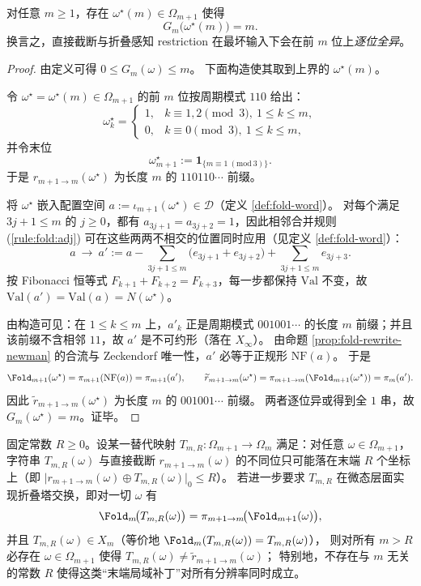 \begin{theorem}\label{thm:fold-gauge-anomaly-max}
对任意 \(m\ge 1\)，存在 \(\omega^\star(m)\in\Omega_{m+1}\) 使得
$$
G_m\bigl(\omega^\star(m)\bigr)=m.
$$
换言之，直接截断与折叠感知 restriction 在最坏输入下会在前 \(m\) 位上\emph{逐位全异}。
\end{theorem}

\begin{proof}
由定义可得 \(0\le G_m(\omega)\le m\)。
下面构造使其取到上界的 \(\omega^\star(m)\)。
\par
令 \(\omega^\star=\omega^\star(m)\in\Omega_{m+1}\) 的前 \(m\) 位按周期模式 \(110\) 给出：
$$
\omega^\star_k=
\begin{cases}
1,& k\equiv 1,2\pmod 3,\ 1\le k\le m,\\
0,& k\equiv 0\pmod 3,\ 1\le k\le m,
\end{cases}
$$
并令末位
$$
\omega^\star_{m+1}:=\mathbf{1}_{\{m\equiv 1\ (\mathrm{mod}\ 3)\}}.
$$
于是 \(r_{m+1\to m}(\omega^\star)\) 为长度 \(m\) 的 \(110110\cdots\) 前缀。
\par
将 \(\omega^\star\) 嵌入配置空间 \(a:=\iota_{m+1}(\omega^\star)\in\mathcal D\)（定义 \ref{def:fold-word}）。
对每个满足 \(3j+1\le m\) 的 \(j\ge 0\)，都有 \(a_{3j+1}=a_{3j+2}=1\)，因此相邻合并规则 (\ref{rule:fold:adj}) 可在这些两两不相交的位置同时应用（见定义 \ref{def:fold-word}）：
$$
a\ \to\ a':=a-\sum_{3j+1\le m}\bigl(e_{3j+1}+e_{3j+2}\bigr)+\sum_{3j+1\le m}e_{3j+3}.
$$
按 Fibonacci 恒等式 \(F_{k+1}+F_{k+2}=F_{k+3}\)，每一步都保持 \(\mathrm{Val}\) 不变，故 \(\mathrm{Val}(a')=\mathrm{Val}(a)=N(\omega^\star)\)。
\par
由构造可见：在 \(1\le k\le m\) 上，\(a'_k\) 正是周期模式 \(001001\cdots\) 的长度 \(m\) 前缀；并且该前缀不含相邻 \(11\)，故 \(a'\) 是不可约形（落在 \(X_\infty\)）。
由命题 \ref{prop:fold-rewrite-newman} 的合流与 Zeckendorf 唯一性，\(a'\) 必等于正规形 \(\mathrm{NF}(a)\)。
于是
$$
\Fold_{m+1}(\omega^\star)=\pi_{m+1}(\mathrm{NF}(a))=\pi_{m+1}(a'),
\qquad
\widetilde r_{m+1\to m}(\omega^\star)=\pi_{m+1\to m}(\Fold_{m+1}(\omega^\star))=\pi_m(a').
$$
因此 \(\widetilde r_{m+1\to m}(\omega^\star)\) 为长度 \(m\) 的 \(001001\cdots\) 前缀。
两者逐位异或得到全 \(1\) 串，故 \(G_m(\omega^\star)=m\)。证毕。
\end{proof}

\begin{corollary}\label{cor:fold-tail-patch-incomplete}
固定常数 \(R\ge 0\)。设某一替代映射 \(T_{m,R}:\Omega_{m+1}\to\Omega_m\) 满足：对任意 \(\omega\in\Omega_{m+1}\)，字符串 \(T_{m,R}(\omega)\) 与直接截断 \(r_{m+1\to m}(\omega)\) 的不同位只可能落在末端 \(R\) 个坐标上（即
\(\bigl|r_{m+1\to m}(\omega)\oplus T_{m,R}(\omega)\bigr|_0\le R\)）。
若进一步要求 \(T_{m,R}\) 在微态层面实现折叠塔交换，即对一切 \(\omega\) 有
\[
\Fold_m\!\bigl(T_{m,R}(\omega)\bigr)=\pi_{m+1\to m}\!\bigl(\Fold_{m+1}(\omega)\bigr),
\]
并且 \(T_{m,R}(\omega)\in X_m\)（等价地 \(\Fold_m(T_{m,R}(\omega))=T_{m,R}(\omega)\)），
则对所有 \(m>R\) 必存在 \(\omega\in\Omega_{m+1}\) 使得 \(T_{m,R}(\omega)\ne \widetilde r_{m+1\to m}(\omega)\)；
特别地，不存在与 \(m\) 无关的常数 \(R\) 使得这类“末端局域补丁”对所有分辨率同时成立。
\end{corollary}

